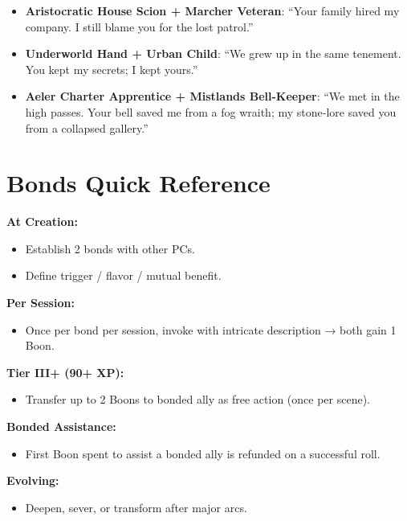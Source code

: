\begin{itemize}
\item \textbf{Aristocratic House Scion + Marcher Veteran}: “Your family hired my company. I still blame you for the lost patrol.”
\item \textbf{Underworld Hand + Urban Child}: “We grew up in the same tenement. You kept my secrets; I kept yours.”
\item \textbf{Aeler Charter Apprentice + Mistlands Bell-Keeper}: “We met in the high passes. Your bell saved me from a fog wraith; my stone‑lore saved you from a collapsed gallery.”
\end{itemize}

\section{Bonds Quick Reference}
\begin{tcolorbox}[colback=gray!5!white,colframe=gray!75!black,title=Bonds Summary,fonttitle=\bfseries]
\textbf{At Creation:}
\begin{itemize}
\item Establish 2 bonds with other PCs.
\item Define trigger / flavor / mutual benefit.
\end{itemize}

\textbf{Per Session:}
\begin{itemize}
\item Once per bond per session, invoke with intricate description → both gain 1 Boon.
\end{itemize}

\textbf{Tier III+ (90+ XP):}
\begin{itemize}
\item Transfer up to 2 Boons to bonded ally as free action (once per scene).
\end{itemize}

\textbf{Bonded Assistance:}
\begin{itemize}
\item First Boon spent to assist a bonded ally is refunded on a successful roll.
\end{itemize}

\textbf{Evolving:}
\begin{itemize}
\item Deepen, sever, or transform after major arcs.
\end{itemize}
\end{tcolorbox}